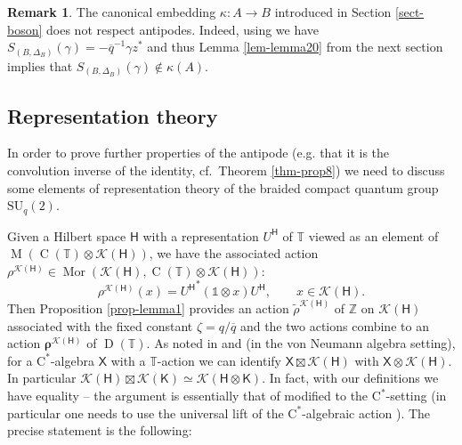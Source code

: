 \documentclass[12pt,reqno,a4paper]{amsart}
\theoremstyle{definition}
\newtheorem{remark}[proposition]{Remark}
\newcommand{\cst}{\ensuremath{\mathrm{C}^*}}
\newcommand{\I}{\mathds{1}}
\newcommand{\tens}{\otimes}
\newcommand{\TT}{\mathbb{T}}
\newcommand{\ZZ}{\mathbb{Z}}
\newcommand{\cK}{\mathscr{K}}
\newcommand{\sH}{\mathsf{H}}
\newcommand{\sK}{\mathsf{K}}
\newcommand{\sX}{\mathsf{X}}
\newcommand{\bh}{{\boldsymbol{h}}}
\newcommand{\brho}{{\boldsymbol{\rho}}}
\DeclareMathOperator{\C}{C}
\DeclareMathOperator{\D}{D}
\DeclareMathOperator{\M}{M}
\DeclareMathOperator{\Mor}{Mor}
\newcommand{\SU}{\mathrm{SU}}
\newcommand{\kmap}{\kappa}
\numberwithin{equation}{section}
\begin{document}
 \begin{remark}
The canonical embedding $\kappa\colon A\to B$ introduced in Section \ref{sect-boson} does not respect antipodes. Indeed, using \cite[Theorem 2.4]{ZhangZhao} we have $S_{(B,\Delta_B)}(\gamma)=-\overline{q}^{-1}\gamma z^*$ and thus Lemma \ref{lem-lemma20} from the next section implies that $S_{(B,\Delta_B)}(\gamma)\not\in\kappa(A)$.
\end{remark}

\subsection{Representation theory}\label{sect-RepTh}

In order to prove further properties of the antipode (e.g. that it is the convolution inverse of the identity, cf.~Theorem \ref{thm-prop8}) we need to discuss some elements of representation theory of the braided compact quantum group $\SU_q(2)$.

Given a Hilbert space $\sH$ with a representation $U^\sH$ of $\TT$ viewed as an element of $\M(\C(\TT)\tens\cK(\sH))$, we have the associated action $\rho^{\cK(\sH)}\in\Mor(\cK(\sH),\C(\TT)\tens\cK(\sH))$:
\[
\rho^{\cK(\sH)}(x)={U^{\sH}}^*(\I\tens x)U^\sH,\qquad{x}\in\cK(\sH).
\]
Then Proposition \ref{prop-lemma1} provides an action $\tilde{\rho}^{\cK(\sH)}$ of $\ZZ$ on $\cK(\sH)$ associated with the fixed constant $\zeta=q/\overline{q}$ and the two actions combine to an action $\brho^{\cK(\sH)}$ of $\D(\TT)$. As noted in \cite[Example 5.17]{MeyerRoyWoronowiczI} and \cite[Section 8.2]{DeCommerKrajczok} (in the von Neumann algebra setting), for a \cst-algebra $\sX$ with a $\TT$-action we can identify $\sX\boxtimes\cK(\sH)$ with $\sX\tens\cK(\sH)$. In particular $\cK(\sH)\boxtimes\cK(\sK)\simeq\cK(\sH\tens\sK)$. In fact, with our definitions we have equality -- the argument is essentially that of \cite[Proposition 8.1]{DeCommerKrajczok} modified to the \cst-setting (in particular one needs to use the universal lift of the \cst-algebraic action \cite{FischerPreprint}). The precise statement is the following:
\end{document}
